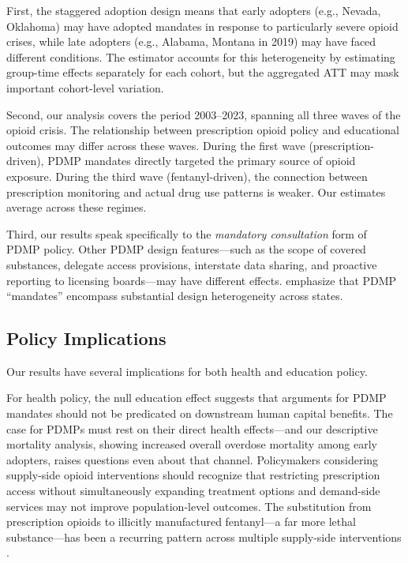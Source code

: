 \documentclass[12pt]{article}
\begin{document}
First, the staggered adoption design means that early adopters (e.g., Nevada, Oklahoma) may have adopted mandates in response to particularly severe opioid crises, while late adopters (e.g., Alabama, Montana in 2019) may have faced different conditions. The \citet{callaway2021difference} estimator accounts for this heterogeneity by estimating group-time effects separately for each cohort, but the aggregated ATT may mask important cohort-level variation.

Second, our analysis covers the period 2003--2023, spanning all three waves of the opioid crisis. The relationship between prescription opioid policy and educational outcomes may differ across these waves. During the first wave (prescription-driven), PDMP mandates directly targeted the primary source of opioid exposure. During the third wave (fentanyl-driven), the connection between prescription monitoring and actual drug use patterns is weaker. Our estimates average across these regimes.

Third, our results speak specifically to the \textit{mandatory consultation} form of PDMP policy. Other PDMP design features---such as the scope of covered substances, delegate access provisions, interstate data sharing, and proactive reporting to licensing boards---may have different effects. \citet{horwitz2021association} emphasize that PDMP ``mandates'' encompass substantial design heterogeneity across states.

\subsection{Policy Implications}

Our results have several implications for both health and education policy.

For health policy, the null education effect suggests that arguments for PDMP mandates should not be predicated on downstream human capital benefits. The case for PDMPs must rest on their direct health effects---and our descriptive mortality analysis, showing increased overall overdose mortality among early adopters, raises questions even about that channel. Policymakers considering supply-side opioid interventions should recognize that restricting prescription access without simultaneously expanding treatment options and demand-side services may not improve population-level outcomes. The substitution from prescription opioids to illicitly manufactured fentanyl---a far more lethal substance---has been a recurring pattern across multiple supply-side interventions \citep{alpert2018supply, evans2019opioid, mallatt2022effect}.
\end{document}
